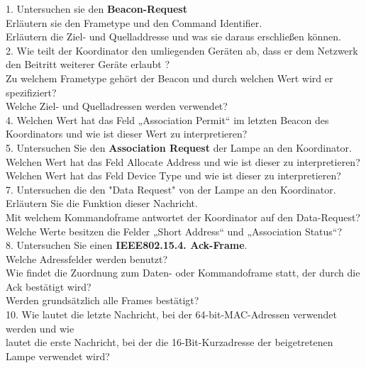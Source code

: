 \begin{Fragen}
1. Untersuchen sie den \textbf{Beacon-Request}\\
Erläutern sie den Frametype und den Command Identifier.\\ 
Erläutern die Ziel- und Quelladdresse und was sie daraus erschließen können.\\

2. Wie teilt der Koordinator den umliegenden Geräten ab, dass er dem Netzwerk den Beitritt weiterer Geräte erlaubt ?\\
Zu welchem Frametype gehört der Beacon und durch welchen Wert wird er spezifiziert?\\
Welche Ziel- und Quelladressen werden verwendet?\\

4. Welchen Wert hat das Feld „Association Permit“ im letzten Beacon des Koordinators und wie ist dieser Wert zu interpretieren? \\

5. Untersuchen Sie den \textbf{Association Request} der Lampe an den Koordinator. \\
Welchen Wert hat das Feld \grqq Allocate Address \grqq{} und wie ist dieser zu interpretieren?\\
Welchen Wert hat das Feld \grqq Device Type\grqq{} und wie ist dieser zu interpretieren?\\

7. Untersuchen die den "Data Request" von der Lampe an den Koordinator.\\
Erläutern Sie die Funktion dieser Nachricht.\\
Mit welchem Kommandoframe antwortet der Koordinator auf den Data-Request?\\
Welche Werte besitzen die Felder „Short Address“ und „Association Status“?\\

8. Untersuchen Sie einen \textbf{IEEE802.15.4. Ack-Frame}.\\
Welche Adressfelder werden benutzt? \\
Wie findet die Zuordnung zum Daten- oder Kommandoframe statt, der durch die Ack bestätigt wird? \\
Werden grundsätzlich alle Frames bestätigt?\\

10. Wie lautet die letzte Nachricht, bei der 64-bit-MAC-Adressen verwendet werden und wie\\
 lautet die erste Nachricht, bei der die 16-Bit-Kurzadresse der beigetretenen Lampe verwendet wird?\\


\end{Fragen}
